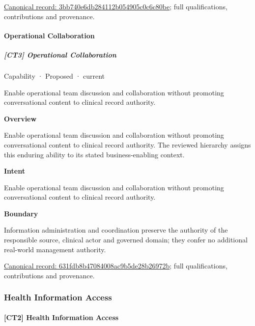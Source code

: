 {\footnotesize \href{../../../../continuum/strategy/capability/3bb740e6db284112b054905c0c6c80be.md}{Canonical record: 3bb740e6db284112b054905c0c6c80be}; full qualifications, contributions and provenance.}\par
\paragraph{Operational Collaboration}

\subparagraph{[CT3] Operational Collaboration}

\label{element:631fdb8b47084008ac9b5de28b26972b}
{\small Capability · Proposed · current}\par

Enable operational team discussion and collaboration without promoting conversational content to clinical record authority.



\textbf{Overview}



Enable operational team discussion and collaboration without promoting conversational content to clinical record authority. The reviewed hierarchy assigns this enduring ability to its stated business-enabling context.



\textbf{Intent}



Enable operational team discussion and collaboration without promoting conversational content to clinical record authority.



\textbf{Boundary}



Information administration and coordination preserve the authority of the responsible source, clinical actor and governed domain; they confer no additional real-world management authority.


{\footnotesize \href{../../../../continuum/strategy/capability/631fdb8b47084008ac9b5de28b26972b.md}{Canonical record: 631fdb8b47084008ac9b5de28b26972b}; full qualifications, contributions and provenance.}\par
\subsubsection{Health Information Access}

\paragraph{[CT2] Health Information Access}

